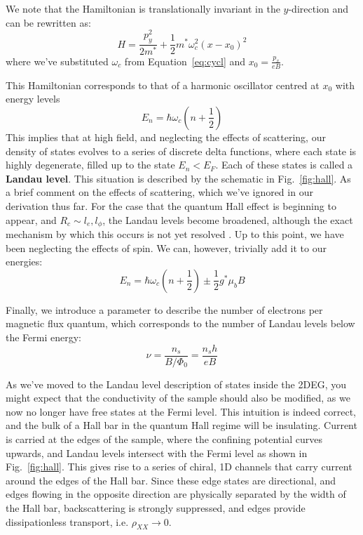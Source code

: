 We note that the Hamiltonian is translationally invariant in the $y$-direction and can be rewritten as:
\begin{equation}
  H = \frac{p_y^2}{2m^*} + \frac{1}{2}m^*\omega_c^2(x - x_0)^2
\end{equation}
where we've substituted $\omega_c$ from Equation~\ref{eq:cycl} and $x_0 = \tfrac{p_x}{eB}$.

This Hamiltonian corresponds to that of a harmonic oscillator centred at $x_0$ with energy levels
\begin{equation}
  E_n = \hbar \omega_c\left(n + \frac{1}{2}\right)
\end{equation}
This implies that at high field, and neglecting the effects of scattering, our density of states evolves to
a series of discrete delta functions, where each state is highly degenerate, filled up to the state $E_n < E_F$.
Each of these states is called a \textbf{Landau level}. This situation is described by the schematic in Fig.~\ref{fig:hall}.
As a brief comment on the effects of scattering, which we've ignored in our derivation thus far. For the case that the quantum Hall effect is beginning to appear, and $R_c \sim l_e, l_\phi$, the Landau levels become broadened, although the exact mechanism
by which this occurs is not yet resolved \cite{PhysRevB.90.035425, PhysRevB.82.075401}. Up to this point,
we have been neglecting the effects of spin. We can, however, trivially add it to our energies:
\begin{equation}
  E_n = \hbar \omega_c\left(n + \frac{1}{2}\right) \pm \frac{1}{2}g^* \mu_b B
\end{equation}

Finally, we introduce a parameter to describe the number of electrons per magnetic flux quantum, which corresponds
to the number of Landau levels below the Fermi energy:
\begin{equation}
  \nu = \frac{n_s}{B / \Phi_0} = \frac{n_s h}{e B}
  \label{eq:nu}
\end{equation}

As we've moved to the Landau level description of states inside the 2DEG, you might expect that the conductivity of the sample should also
be modified, as we now no longer have free states at the Fermi level. This intuition is indeed correct, and the bulk of a Hall bar in the quantum
Hall regime will be insulating. Current is carried at the edges of the sample, where the confining potential curves upwards, and Landau levels
intersect with the Fermi level \cite{PhysRevB.25.2185} as shown in Fig.~\ref{fig:hall}. This gives rise to a series of chiral, 1D channels that carry current around the edges
of the Hall bar. Since these edge states are directional, and edges flowing in the opposite direction are physically separated by the width of the Hall
bar, backscattering is strongly suppressed, and edges provide dissipationless transport, i.e. $\rho_{XX} \rightarrow 0$.

